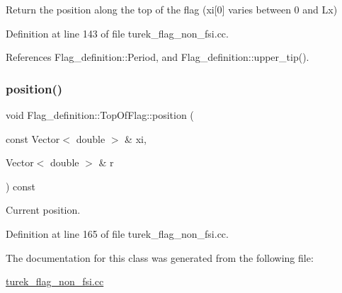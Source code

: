 Return the position along the top of the flag (xi\mbox{[}0\mbox{]} varies between 0 and Lx) 



Definition at line 143 of file turek\+\_\+flag\+\_\+non\+\_\+fsi.\+cc.



References Flag\+\_\+definition\+::\+Period, and Flag\+\_\+definition\+::upper\+\_\+tip().

\mbox{\label{classFlag__definition_1_1TopOfFlag_a0a902ee453f96231b41aa66e3c3b8bf0}} 
\subsubsection{\texorpdfstring{position()}{position()}\hspace{0.1cm}{\footnotesize\ttfamily [2/2]}}
{\footnotesize\ttfamily void Flag\+\_\+definition\+::\+Top\+Of\+Flag\+::position (\begin{DoxyParamCaption}\item[{const Vector$<$ double $>$ \&}]{xi,  }\item[{Vector$<$ double $>$ \&}]{r }\end{DoxyParamCaption}) const\hspace{0.3cm}{\ttfamily [inline]}}



Current position. 



Definition at line 165 of file turek\+\_\+flag\+\_\+non\+\_\+fsi.\+cc.



The documentation for this class was generated from the following file\+:\begin{DoxyCompactItemize}
\item 
\hyperlink{turek__flag__non__fsi_8cc}{turek\+\_\+flag\+\_\+non\+\_\+fsi.\+cc}\end{DoxyCompactItemize}

